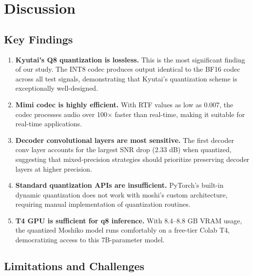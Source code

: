 \documentclass[12pt,a4paper]{report}
\begin{document}
\chapter{Discussion}

\section{Key Findings}

\begin{enumerate}
    \item \textbf{Kyutai's Q8 quantization is lossless.} This is the most significant finding of our study. The INT8 codec produces output identical to the BF16 codec across all test signals, demonstrating that Kyutai's quantization scheme is exceptionally well-designed.

    \item \textbf{Mimi codec is highly efficient.} With RTF values as low as 0.007, the codec processes audio over 100$\times$ faster than real-time, making it suitable for real-time applications.

    \item \textbf{Decoder convolutional layers are most sensitive.} The first decoder conv layer accounts for the largest SNR drop (2.33 dB) when quantized, suggesting that mixed-precision strategies should prioritize preserving decoder layers at higher precision.

    \item \textbf{Standard quantization APIs are insufficient.} PyTorch's built-in dynamic quantization does not work with moshi's custom architecture, requiring manual implementation of quantization routines.

    \item \textbf{T4 GPU is sufficient for q8 inference.} With 8.4--8.8 GB VRAM usage, the quantized Moshiko model runs comfortably on a free-tier Colab T4, democratizing access to this 7B-parameter model.
\end{enumerate}

\section{Limitations and Challenges}
\end{document}
